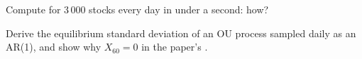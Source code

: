 \begin{interviewq}\label{iq:s1:residual-and-principal-component-stat-arb:5}
Compute  for 3\,000 stocks every day in under a second: how?
\end{interviewq}

\begin{interviewq}\label{iq:s1:residual-and-principal-component-stat-arb:6}
Derive the equilibrium standard deviation of an OU process sampled daily as an AR(1), and show why $X_{60} = 0$ in the paper's .
\end{interviewq}
